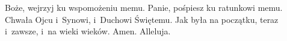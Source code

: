 \startdialog
{} Boże, wejrzyj ku wspomożeniu memu.
 Panie, pośpiesz ku ratunkowi memu.
\stopdialog
Chwała Ojcu i~Synowi, i~Duchowi Świętemu.\crlf
Jak była na początku, teraz i~zawsze,\crlf
i~na wieki wieków. Amen. Alleluja.
